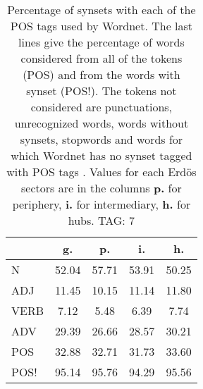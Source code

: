 \begin{table}[h!]
\begin{center}
\begin{tabular}{| l || c | c | c | c |}\hline
 & {\bf g.} & {\bf p.} & {\bf i.} & {\bf h.} \\\hline\hline
N & 52.04  & 57.71  & 53.91  & 50.25 \\\hline
ADJ & 11.45  & 10.15  & 11.14  & 11.80 \\\hline
VERB & 7.12  & 5.48  & 6.39  & 7.74 \\\hline
ADV & 29.39  & 26.66  & 28.57  & 30.21 \\\hline\hline
POS & 32.88  & 32.71  & 31.73  & 33.60 \\\hline
POS! & 95.14  & 95.76  & 94.29  & 95.56 \\\hline
\end{tabular}
\caption{Percentage of synsets with each of the POS tags used by Wordnet. The last lines give the percentage of words considered from all of the tokens (POS) and from the words with synset (POS!). The tokens not considered are punctuations, unrecognized words, words without synsets, stopwords and words for which Wordnet has no synset  tagged with POS tags . Values for each Erd\"os sectors are in the columns {{\bf p.}} for periphery, {{\bf i.}} for intermediary, {{\bf h.}} for hubs. TAG: 7}
\end{center}
\end{table}